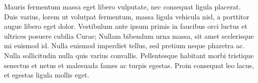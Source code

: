 
\begin{myDedication}

Mauris fermentum massa eget libero vulputate, nec consequat ligula placerat. Duis varius, lorem ut volutpat fermentum, massa ligula vehicula nisl, a porttitor augue libero eget dolor. Vestibulum ante ipsum primis in faucibus orci luctus et ultrices posuere cubilia Curae; Nullam bibendum urna massa, sit amet scelerisque mi euismod id. Nulla euismod imperdiet tellus, sed pretium neque pharetra ac. Nulla sollicitudin nulla quis varius convallis. Pellentesque habitant morbi tristique senectus et netus et malesuada fames ac turpis egestas. Proin consequat leo lacus, et egestas ligula mollis eget.
    
\end{myDedication}